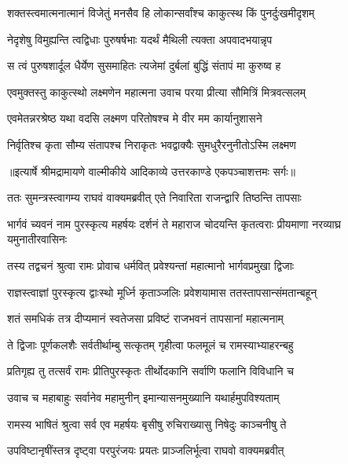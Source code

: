 \twolineshloka
{शक्तस्त्वमात्मनात्मानं विजेतुं मनसैव हि}
{लोकान्सर्वांश्च काकुत्स्थ किं पुनर्दुःखमीदृशम्} %

\twolineshloka
{नेदृशेषु विमुह्यन्ति त्वद्विधाः पुरुषर्षभाः}
{यदर्थं मैथिली त्यक्ता अपवादभयान्नृप} %

\twolineshloka
{स त्वं पुरुषशार्दूल धैर्येण सुसमाहितः}
{त्यजेमां दुर्बलां बुद्धिं संतापं मा कुरुष्व ह} %

\twolineshloka
{एवमुक्तस्तु काकुत्स्थो लक्ष्मणेन महात्मना}
{उवाच परया प्रीत्या सौमित्रिं मित्रवत्सलम्} %

\twolineshloka
{एवमेतन्नरश्रेष्ठ यथा वदसि लक्ष्मण}
{परितोषश्च मे वीर मम कार्यानुशासने} %

\twolineshloka
{निर्वृतिश्च कृता सौम्य संतापश्च निराकृतः}
{भवद्वाक्यैः सुमधुरैरनुनीतोऽस्मि लक्ष्मण} %


{॥इत्यार्षे श्रीमद्रामायणे वाल्मीकीये आदिकाव्ये उत्तरकाण्डे एकपञ्चाशत्तमः सर्गः॥}


\twolineshloka
{ततः सुमन्त्रस्त्वागम्य राघवं वाक्यमब्रवीत्}
{एते निवारिता राजन्द्वारि तिष्ठन्ति तापसाः} %

\threelineshloka
{भार्गवं च्यवनं नाम पुरस्कृत्य महर्षयः}
{दर्शनं ते महाराज चोदयन्ति कृतत्वराः}
{प्रीयमाणा नरव्याघ्र यमुनातीरवासिनः} %

\twolineshloka
{तस्य तद्वचनं श्रुत्वा रामः प्रोवाच धर्मवित्}
{प्रवेश्यन्तां महात्मानो भार्गवप्रमुखा द्विजाः} %

\twolineshloka
{राज्ञस्त्वाज्ञां पुरस्कृत्य द्वाःस्थो मूर्ध्नि कृताञ्जलिः}
{प्रवेशयामास ततस्तापसान्संमतान्बहून्} %

\twolineshloka
{शतं समधिकं तत्र दीप्यमानं स्वतेजसा}
{प्रविष्टं राजभवनं तापसानां महात्मनाम्} %

\twolineshloka
{ते द्विजाः पूर्णकलशैः सर्वतीर्थाम्बु सत्कृतम्}
{गृहीत्वा फलमूलं च रामस्याभ्याहरन्बहु} %

\twolineshloka
{प्रतिगृह्य तु तत्सर्वं रामः प्रीतिपुरस्कृतः}
{तीर्थोदकानि सर्वाणि फलानि विविधानि च} %

\twolineshloka
{उवाच च महाबाहुः सर्वानेव महामुनीन्}
{इमान्यासनमुख्यानि यथार्हमुपविश्यताम्} %

\twolineshloka
{रामस्य भाषितं श्रुत्वा सर्व एव महर्षयः}
{बृसीषु रुचिराख्यासु निषेदुः काञ्चनीषु ते} %

\twolineshloka
{उपविष्टानृषींस्तत्र दृष्ट्वा परपुरंजयः}
{प्रयतः प्राञ्जलिर्भूत्वा राघवो वाक्यमब्रवीत्} %

